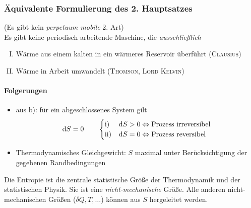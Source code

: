 \subsubsection{Äquivalente Formulierung des 2. Hauptsatzes}
(Es gibt kein \emph{perpetuum mobile} 2. Art) \\
Es gibt keine periodisch arbeitende Maschine, die \emph{ausschließlich}
\begin{enumerate}[I.]
    \item Wärme aus einem kalten in ein wärmeres Reservoir überführt (\textsc{Clausius})
    \item Wärme in Arbeit umwandelt (\textsc{Thomson}, \textsc{Lord Kelvin})
\end{enumerate}
\paragraph{Folgerungen}
\begin{itemize}
    \item aus b): für ein abgeschlossenes System gilt
    \begin{equation}
        \mathrm{d} S = 0 \qquad
        \begin{cases}
            \text{i) } & \mathrm{d} S > 0 \Leftrightarrow \text{Prozess irreversibel} \\
            \text{ii)} & \mathrm{d} S = 0 \Leftrightarrow \text{Prozess reversibel}
        \end{cases}
    \end{equation}
    \item Thermodynamisches Gleichgewicht: $S$ maximal unter Berücksichtigung der gegebenen Randbedingungen
\end{itemize}
Die Entropie ist die zentrale statistische Größe der Thermodynamik und der statistischen Physik. Sie ist eine \emph{nicht-mechanische} Größe.
Alle anderen nicht-mechanischen Größen ($\delta Q, T, \ldots$) können aus $S$ hergeleitet werden.
